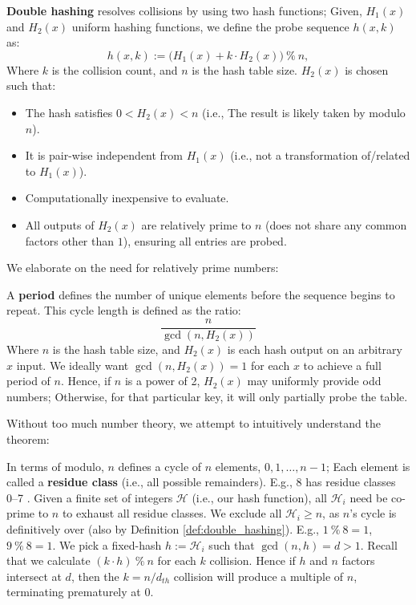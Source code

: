 \newpage 

\begin{Def}

  \label{def:double_hashing}
  \textbf{Double hashing} resolves collisions by using two hash functions; Given, $H_1(x)$ and $H_2(x)$ uniform hashing functions,
  we define the probe sequence $h(x,k)$ as:
  \[
    h(x,k) := \bigl(H_1(x) + k \cdot H_2(x)\bigr)\ \%\ n,
  \]
  Where $k$ is the collision count, and $n$ is the hash table size.
  $H_2(x)$ is chosen such that:
  \begin{itemize}
    \item The hash satisfies $0 < H_2(x) < n$ (i.e., The result is likely taken by modulo $n$).
    \item It is pair-wise independent from $H_1(x)$ (i.e., not a transformation of/related to $H_1(x)$).
    \item Computationally inexpensive to evaluate.
    \item All outputs of $H_2(x)$ are relatively prime to $n$ (does not share any common factors other than $1$), ensuring all entries are probed.
  \end{itemize}
\end{Def}

\noindent 
We elaborate on the need for relatively prime numbers:
\begin{theo}
 
    \label{thm:probes_period}
    A \textbf{period} defines the number of unique elements before the sequence begins to repeat. This cycle length is defined as the ratio:
    \[ \dfrac{n}{\gcd(n, H_2(x))} \]
    Where $n$ is the hash table size, and $H_2(x)$ is each hash output on an arbitrary $x$ input. We ideally want $\gcd(n, H_2(x))=1$ 
    for each $x$ to achieve a full period of $n$. Hence, if $n$ is a power of 2,
    $H_2(x)$ may uniformly provide odd numbers; Otherwise, for that particular key, it will only partially probe the table.
\end{theo}

\noindent
Without too much number theory, we attempt to intuitively understand the theorem:
\begin{Proof}

    \label{proof:probes_period}
    In terms of modulo, $n$ defines a cycle of $n$ elements, $0, 1, \ldots, n-1$; Each element is called a \textbf{residue class} (i.e., all possible remainders).
    E.g., 8 has residue classes 0--7 . Given a finite set of integers $\mathcal{H}$ (i.e., our hash function),
    all $\mathcal{H}_i$ need be co-prime to $n$ to exhaust all residue classes. We exclude all $\mathcal{H}_i \geq n$, as $n$'s cycle is definitively
    over (also by Definition \ref{def:double_hashing}). E.g., $1\ \%\ 8 = 1$, $9\ \%\ 8 = 1$. We pick a fixed-hash $h:=\mathcal{H}_i$ such that $\gcd(n, h) = d > 1$.
    Recall that we calculate $(k \cdot h)\ \%\ n$ for each $k$ collision. Hence if $h$ and $n$ factors intersect at $d$,
    then the $k = n/d_{th}$ collision will produce a multiple of $n$, terminating prematurely at $0$.

\end{Proof}

